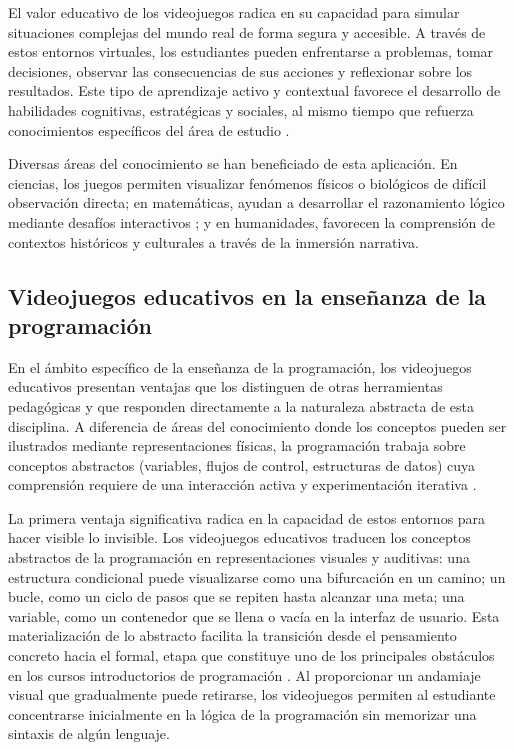 El valor educativo de los videojuegos radica en su capacidad para simular
situaciones complejas del mundo real de forma segura y accesible. A través
de estos entornos virtuales, los estudiantes pueden enfrentarse a problemas,
tomar decisiones, observar las consecuencias de sus acciones y reflexionar
sobre los resultados. Este tipo de aprendizaje activo y contextual favorece
el desarrollo de habilidades cognitivas, estratégicas y sociales, al mismo
tiempo que refuerza conocimientos específicos del área de estudio
\cite{ashinoff_potential_2014, padron_gonzalez_uso_2023}.

Diversas áreas del conocimiento se han beneficiado de esta aplicación. En
ciencias, los juegos permiten visualizar fenómenos físicos o biológicos de
difícil observación directa; en matemáticas, ayudan a desarrollar el
razonamiento lógico mediante desafíos interactivos
\cite{ibrahim_students_2010, mathew_teaching_2019, leutenegger_games_nodate,
	silva_systematic_2020}; y en humanidades, favorecen la comprensión de
contextos históricos y culturales a través de la inmersión narrativa.

\subsection{Videojuegos educativos en la enseñanza de la programación}

En el ámbito específico de la enseñanza de la programación, los videojuegos educativos presentan ventajas que los distinguen de otras herramientas pedagógicas y que responden directamente a la naturaleza abstracta de esta disciplina. A diferencia de áreas del conocimiento donde los conceptos pueden ser ilustrados mediante representaciones físicas, la programación trabaja sobre conceptos abstractos (variables, flujos de control, estructuras de datos) cuya comprensión requiere de una interacción activa y experimentación iterativa \cite{ibrahim_students_2010}.

La primera ventaja significativa radica en la capacidad de estos entornos para hacer visible lo invisible. Los videojuegos educativos traducen los conceptos abstractos de la programación en representaciones visuales y auditivas: una estructura condicional puede visualizarse como una bifurcación en un camino; un bucle, como un ciclo de pasos que se repiten hasta alcanzar una meta; una variable, como un contenedor que se llena o vacía en la interfaz de usuario. Esta materialización de lo abstracto facilita la transición desde el pensamiento concreto hacia el formal, etapa que constituye uno de los principales obstáculos en los cursos introductorios de programación \cite{velasco-ramirez_impacto_2023}. Al proporcionar un andamiaje visual que gradualmente puede retirarse, los videojuegos permiten al estudiante concentrarse inicialmente en la lógica de la programación sin memorizar una sintaxis de algún lenguaje\cite{maloney_scratch_2010}.

